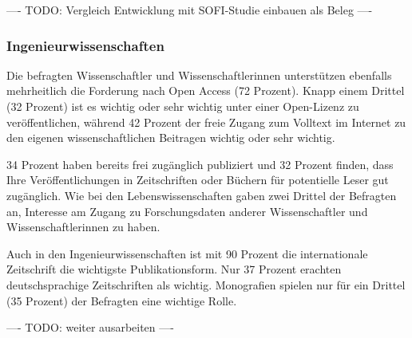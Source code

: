 ---- TODO: Vergleich Entwicklung mit SOFI-Studie einbauen als Beleg ----

\subsubsection{Ingenieurwissenschaften}

Die befragten Wissenschaftler und Wissenschaftlerinnen unterstützen ebenfalls mehrheitlich die Forderung nach Open Access (72 Prozent). Knapp einem Drittel (32 Prozent) ist es wichtig oder sehr wichtig unter einer Open-Lizenz zu veröffentlichen, während 42 Prozent der freie Zugang zum Volltext im Internet zu den eigenen wissenschaftlichen Beitragen wichtig oder sehr wichtig.

34 Prozent haben bereits frei zugänglich publiziert und 32 Prozent finden, dass Ihre Veröffentlichungen in Zeitschriften oder Büchern für potentielle Leser gut zugänglich. Wie bei den Lebenswissenschaften gaben zwei Drittel der Befragten an, Interesse am Zugang zu Forschungsdaten anderer Wissenschaftler und Wissenschaftlerinnen zu haben.

Auch in den Ingenieurwissenschaften ist mit 90 Prozent die internationale Zeitschrift die wichtigste Publikationsform. Nur 37 Prozent erachten deutschsprachige Zeitschriften als wichtig. Monografien spielen nur für ein Drittel (35 Prozent) der Befragten eine wichtige Rolle.

---- TODO: weiter ausarbeiten ----
